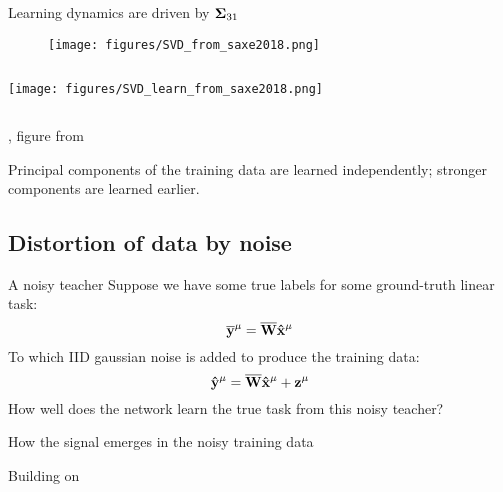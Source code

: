 \documentclass{beamer}
\newcommand{\bb}[1]{{\bf\overline{#1}}}
\newcommand{\bh}[1]{{\bf\hat{#1}}}
\begin{document}
\begin{frame}{Learning dynamics are driven by ${\bf\Sigma}_{31}$}
\begin{figure}
\centering
\texttt{[image: figures/SVD\_from\_saxe2018.png]}
\end{figure}
\begin{columns}
\begin{column}{0.5\textwidth}
\texttt{[image: figures/SVD\_learn\_from\_saxe2018.png]}
\end{column}
\begin{column}{0.5\textwidth}
\centering
{}
\end{column}
\end{columns}
{\footnotesize \citep{Saxe2013}, figure from \citep{Saxe2018}}
\end{frame}

\begin{frame}[standout]
Principal components of the training data are learned independently; stronger components are learned earlier.
\end{frame}

\subsection{Distortion of data by noise}
\begin{frame}{A noisy teacher}
Suppose we have some true labels for some ground-truth linear task:
$$\bb{y}^{\mu} = \bb{W}\bh{x}^\mu$$
To which IID gaussian noise is added to produce the training data:
$$\bh{y}^{\mu} = \bb{W}\bh{x}^\mu + \bf{z} ^ \mu$$
How well does the network learn the true task from this noisy teacher? 
\end{frame}

\begin{frame}{How the signal emerges in the noisy training data}
\vspace{-0.5em}
\begin{center}
%

\end{center}
\vspace{-1em}
{\footnotesize Building on \citet{Benaych-Georges2012}}
\end{frame}
\end{document}
